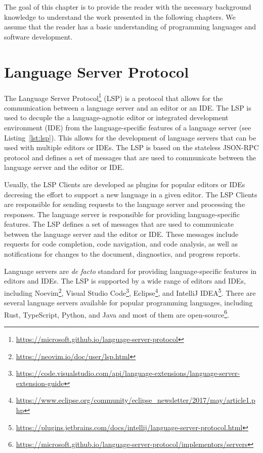 The goal of this chapter is to provide the reader with the necessary background knowledge to understand the work presented in the following chapters. We assume that the reader has a basic understanding of programming languages and software development.

\section{Language Server Protocol}\label{sec:LanguageServerProtocol}
The Language Server Protocol\footnote{\url{https://microsoft.github.io/language-server-protocol}} (LSP) is a protocol that allows for the communication between a language server and an editor or an IDE. The LSP is used to decuple the a language-agnotic editor or integrated development environment (IDE) from the language-specific features of a language server (see Listing~\ref{lst:lsp}). This allows for the development of language servers that can be used with multiple editors or IDEs. The LSP is based on the stateless JSON-RPC protocol and defines a set of messages that are used to communicate between the language server and the editor or IDE.

Usually, the LSP Clients are developed as plugins for popular editors or IDEs decresing the effort to support a new language in a given editor. The LSP Clients are responsible for sending requests to the language server and processing the responses. The language server is responsible for providing language-specific features. The LSP defines a set of messages that are used to communicate between the language server and the editor or IDE. These messages include requests for code completion, code navigation, and code analysis, as well as notifications for changes to the document, diagnostics, and progress reports.

Language servers are \textit{de facto} standard for providing language-specific features in editors and IDEs. The LSP is supported by a wide range of editors and IDEs, including Noevim\footnote{\url{https://neovim.io/doc/user/lsp.html}}, Visual Studio Code\footnote{\url{https://code.visualstudio.com/api/language-extensions/language-server-extension-guide}}, Eclipse\footnote{\url{https://www.eclipse.org/community/eclipse_newsletter/2017/may/article1.php}}, and IntelliJ IDEA\footnote{\url{https://plugins.jetbrains.com/docs/intellij/language-server-protocol.html}}. There are several language servers available for popular programming languages, including Rust, TypeScript, Python, and Java and most of them are open-source\footnote{\url{https://microsoft.github.io/language-server-protocol/implementors/servers}}.

